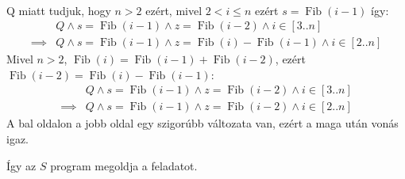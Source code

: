 \documentclass[a4paper,12pt]{article}
\begin{document}
\begin{solution}
\begin{enumerate}
\begin{enumerate}
\begin{align*}
				\end{align*}
				Q miatt tudjuk, hogy $n > 2$ ezért, mivel $ 2 < i \le n $ ezért $ s = \mathop{Fib}(i-1)$ így:
				\begin{align*}
					&Q \land s = \mathop{Fib}(i-1) \land z = \mathop{Fib}(i-2) \land i \in [3..n] \\ \implies
					&Q \land s = \mathop{Fib}(i-1) \land z = \mathop{Fib}(i) - \mathop{Fib}(i-1) \land  i \in [2..n]
				\end{align*}
				Mivel $n > 2$, $ \mathop{Fib}(i) = \mathop{Fib}(i-1) + \mathop{Fib}(i-2) $, ezért ${ \mathop{Fib}(i-2) = \mathop{Fib}(i) - \mathop{Fib}(i-1) }$:
				\begin{align*}
					&Q \land s = \mathop{Fib}(i-1) \land z = \mathop{Fib}(i-2) \land i \in [3..n] \\ \implies
					&Q \land s = \mathop{Fib}(i-1) \land z = \mathop{Fib}(i-2) \land  i \in [2..n]
				\end{align*}
				A bal oldalon a jobb oldal egy szigorúbb változata van, ezért a maga után vonás igaz. \checkmark
			\end{enumerate}
		\end{enumerate}
		Így az $S$ program megoldja a feladatot.
	\end{solution}
\end{document}

